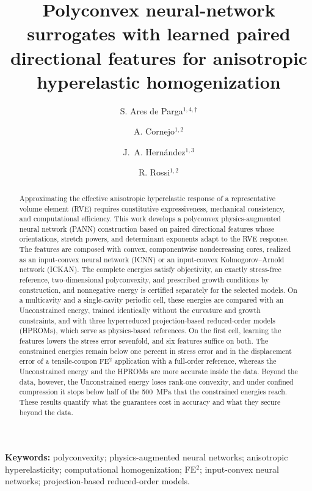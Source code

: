 \documentclass[10pt,a4paper]{article}
\title{Polyconvex neural-network surrogates with learned paired directional features for anisotropic hyperelastic homogenization}
\author{
S. Ares de Parga$^{1,4,\dagger}$ \and
A. Cornejo$^{1,2}$ \and
J.~A. Hern\'andez$^{1,3}$ \and
R. Rossi$^{1,2}$
}
\date{\parbox{.97\textwidth}{\centering\footnotesize
$^1$Centre Internacional de M\`{e}todes Num\`{e}rics en Enginyeria (CIMNE), Barcelona, Spain\\[.3em]
$^2$Universitat Polit\`{e}cnica de Catalunya, Department of Civil and Environmental Engineering (DECA), Barcelona, Spain\\[.3em]
$^3$Universitat Polit\`{e}cnica de Catalunya, Departament de Resist\`{e}ncia de Materials i Estructures a l'Enginyeria, E.S. d'Enginyeries Industrial, Aeroespacial i Audiovisual de Terrassa (ESEIAAT), Terrassa, Spain\\[.3em]
$^4$Department of Aeronautics and Astronautics, Stanford University, Stanford, CA 94305, USA\\[.7em]
\textsuperscript{\(\dagger\)} This work was conducted while S. Ares de Parga was affiliated with CIMNE.\\[.7em]
26 September 2026}}
\begin{document}
\maketitle
\begin{abstract}
Approximating the effective anisotropic hyperelastic response of a representative volume element (RVE) requires constitutive expressiveness, mechanical consistency, and computational efficiency. This work develops a polyconvex physics-augmented neural network (PANN) construction based on paired directional features whose orientations, stretch powers, and determinant exponents adapt to the RVE response. The features are composed with convex, componentwise nondecreasing cores, realized as an input-convex neural network (ICNN) or an input-convex Kolmogorov--Arnold network (ICKAN). The complete energies satisfy objectivity, an exactly stress-free reference, two-dimensional polyconvexity, and prescribed growth conditions by construction, and nonnegative energy is certified separately for the selected models. On a multicavity and a single-cavity periodic cell, these energies are compared with an Unconstrained energy, trained identically without the curvature and growth constraints, and with three hyperreduced projection-based reduced-order models (HPROMs), which serve as physics-based references. On the first cell, learning the features lowers the stress error sevenfold, and six features suffice on both. The constrained energies remain below one percent in stress error and in the displacement error of a tensile-coupon FE$^2$ application with a full-order reference, whereas the Unconstrained energy and the HPROMs are more accurate inside the data. Beyond the data, however, the Unconstrained energy loses rank-one convexity, and under confined compression it stops below half of the 500~MPa that the constrained energies reach. These results quantify what the guarantees cost in accuracy and what they secure beyond the data.
\end{abstract}
\noindent\textbf{Keywords:} polyconvexity; physics-augmented neural networks; anisotropic hyperelasticity; computational homogenization; FE$^2$; input-convex neural networks; projection-based reduced-order models.








\end{document}
